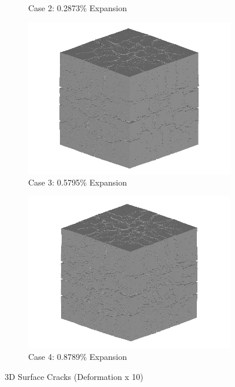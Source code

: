 \begin{figure}[!h]
\begin{subfigure}{.5\textwidth}
    \caption{Case 2: 0.2873\% Expansion}
    \end{subfigure}%
    \begin{subfigure}{.5\textwidth}
      \centering
      \includegraphics[width=.8\linewidth]{Files/exp_3D/DEF/A30X0C_3_3d.png}
    \caption{Case 3: 0.5795\% Expansion}
    \end{subfigure}
    \begin{subfigure}{.5\textwidth}
      \centering
      \includegraphics[width=.8\linewidth]{Files/exp_3D/DEF/A30X0C_4_3d.png}
    \caption{Case 4: 0.8789\% Expansion}
    \end{subfigure}%

  \caption{3D Surface Cracks (Deformation x 10)}
  \label{fig:DEF_A30X0C_3D}
\end{figure}

